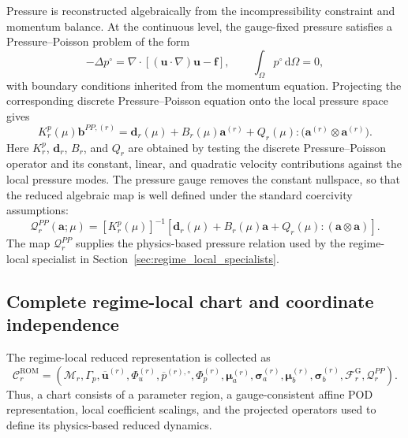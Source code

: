 Pressure is reconstructed algebraically from the incompressibility constraint
and momentum balance.  At the continuous level, the gauge-fixed pressure
satisfies a Pressure--Poisson problem of the form
\begin{equation}
  -\Delta p^{\circ}
  =
  \nabla\!\cdot
  \left[(\boldsymbol{u}\!\cdot\!\nabla)\boldsymbol{u}
        -\boldsymbol{f}\right],
  \qquad
  \int_{\Omega}p^{\circ}\,\mathrm{d}\Omega=0,
  \label{eq:pressure_poisson_strong_form}
\end{equation}
with boundary conditions inherited from the momentum equation.  Projecting
the corresponding discrete Pressure--Poisson equation onto the local pressure
space gives
\begin{equation}
  K_r^p(\mu)\boldsymbol{b}^{PP,(r)}
  =
  \boldsymbol{d}_r(\mu)
  +B_r(\mu)\boldsymbol{a}^{(r)}
  +Q_r(\mu):
   \bigl(\boldsymbol{a}^{(r)}\otimes\boldsymbol{a}^{(r)}\bigr).
  \label{eq:reduced_pressure_poisson_system}
\end{equation}
Here $K_r^p$, $\boldsymbol{d}_r$, $B_r$, and $Q_r$ are obtained by testing
the discrete Pressure--Poisson operator and its constant, linear, and
quadratic velocity contributions against the local pressure modes.  The
pressure gauge removes the constant nullspace, so that the reduced algebraic
map is well defined under the standard coercivity assumptions:
\begin{equation}
  \mathscr{Q}^{PP}_r(\boldsymbol{a};\mu)
  =
  [K_r^p(\mu)]^{-1}
  \left[
    \boldsymbol{d}_r(\mu)
    +B_r(\mu)\boldsymbol{a}
    +Q_r(\mu):(\boldsymbol{a}\otimes\boldsymbol{a})
  \right].
  \label{eq:chart_local_pressure_poisson_map}
\end{equation}
The map $\mathscr{Q}^{PP}_r$ supplies the physics-based pressure relation used
by the regime-local specialist in Section~\ref{sec:regime_local_specialists}.

\subsection{Complete regime-local chart and coordinate independence}
\label{subsec:complete_regime_local_rom_chart}

The regime-local reduced representation is collected as
\begin{equation}
  \mathcal{C}^{\mathrm{ROM}}_r
  =
  \left(
    \mathcal{M}_r,
    \Gamma_p,
    \overline{\boldsymbol{u}}^{(r)},
    \Phi_u^{(r)},
    \overline{p}^{(r),\circ},
    \Phi_p^{(r)},
    \boldsymbol{\mu}_a^{(r)},
    \boldsymbol{\sigma}_a^{(r)},
    \boldsymbol{\mu}_b^{(r)},
    \boldsymbol{\sigma}_b^{(r)},
    \mathscr{F}^{\mathrm{G}}_r,
    \mathscr{Q}^{PP}_r
  \right).
  \label{eq:local_chart_contract}
\end{equation}
Thus, a chart consists of a parameter region, a gauge-consistent affine POD
representation, local coefficient scalings, and the projected operators used
to define its physics-based reduced dynamics.

